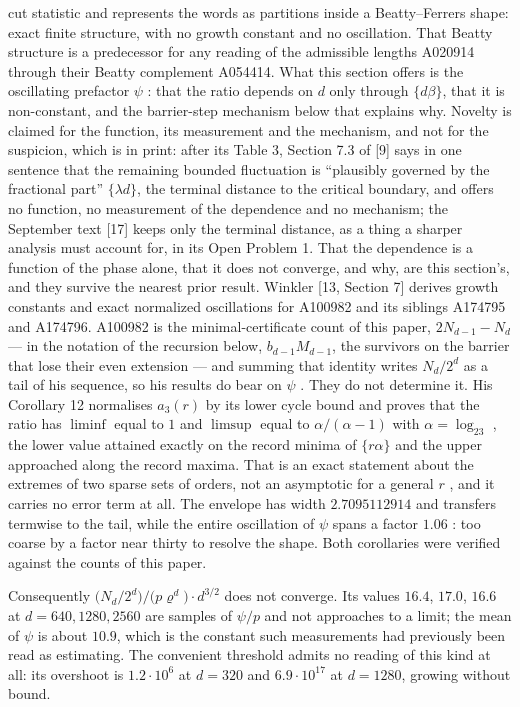\documentclass[11pt,a4paper]{article}
\begin{document}
cut statistic and represents the words as partitions inside a
Beatty--Ferrers shape: exact finite structure, with no growth constant
and no oscillation. That Beatty structure is a predecessor for any
reading of the admissible lengths A020914 through their Beatty
complement A054414. What this section offers is the oscillating
prefactor \(\psi\) : that the ratio depends on \(d\) only through
\(\{d\beta\}\), that it is non-constant, and the barrier-step mechanism
below that explains why. Novelty is claimed for the function, its
measurement and the mechanism, and not for the suspicion, which is in
print: after its Table 3, Section 7.3 of {[}9{]} says in one sentence
that the remaining bounded fluctuation is ``plausibly governed by the
fractional part'' \(\{\lambda d\}\), the terminal distance to the
critical boundary, and offers no function, no measurement of the
dependence and no mechanism; the September text {[}17{]} keeps only the
terminal distance, as a thing a sharper analysis must account for, in
its Open Problem 1. That the dependence is a function of the phase
alone, that it does not converge, and why, are this section's, and they
survive the nearest prior result. Winkler {[}13, Section 7{]} derives
growth constants and exact normalized oscillations for A100982 and its
siblings A174795 and A174796. A100982 is the minimal-certificate count
of this paper, \(2N_{d-1}-N_d\) --- in the notation of the recursion
below, \(b_{d-1}M_{d-1}\), the survivors on the barrier that lose their
even extension --- and summing that identity writes \(N_d/2^d\) as a
tail of his sequence, so his results do bear on \(\psi\) . They do not
determine it. His Corollary 12 normalises \(a_3(r)\) by its lower cycle
bound and proves that the ratio has \(\liminf\) equal to \(1\) and
\(\limsup\) equal to \(\alpha/(\alpha-1)\) with \(\alpha=\log_23\) , the
lower value attained exactly on the record minima of \(\{r\alpha\}\) and
the upper approached along the record maxima. That is an exact statement
about the extremes of two sparse sets of orders, not an asymptotic for a
general \(r\) , and it carries no error term at all. The envelope has
width \(2.7095112914\) and transfers termwise to the tail, while the
entire oscillation of \(\psi\) spans a factor \(1.06\) : too coarse by a
factor near thirty to resolve the shape. Both corollaries were verified
against the counts of this paper.

Consequently \(\bigl(N_d/2^d\bigr)\big/\bigl(p\varrho^{d}\bigr)\cdot
d^{3/2}\) does not converge. Its values \(16.4\), \(17.0\), \(16.6\) at
\(d=640,1280,2560\) are samples of \(\psi/p\) and not approaches to a
limit; the mean of \(\psi\) is about \(10.9\), which is the constant
such measurements had previously been read as estimating. The convenient
threshold admits no reading of this kind at all: its overshoot is
\(1.2\cdot10^{6}\) at \(d=320\) and \(6.9\cdot10^{17}\) at \(d=1280\),
growing without bound.
\end{document}
